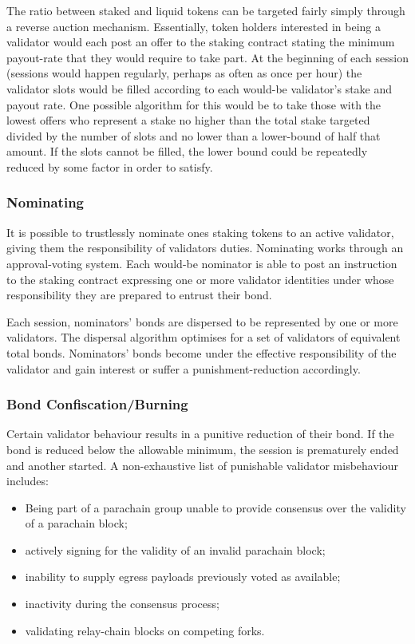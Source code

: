 \documentclass[9pt,oneside]{amsart}
\begin{document}
\begin{multicols}{2}
 The ratio between staked and liquid tokens can be targeted fairly simply through a reverse auction mechanism. Essentially, token holders interested in being a validator would each post an offer to the staking contract stating the minimum payout-rate that they would require to take part. At the beginning of each session (sessions would happen regularly, perhaps as often as once per hour) the validator slots would be filled according to each would-be validator's stake and payout rate. One possible algorithm for this would be to take those with the lowest offers who represent a stake no higher than the total stake targeted divided by the number of slots and no lower than a lower-bound of half that amount. If the slots cannot be filled, the lower bound could be repeatedly reduced by some factor in order to satisfy.

\subsubsection{Nominating}
\label{nominating}

 It is possible to trustlessly nominate ones staking tokens to an active validator, giving them the responsibility of validators duties. Nominating works through an approval-voting system. Each would-be nominator is able to post an instruction to the staking contract expressing one or more validator identities under whose responsibility they are prepared to entrust their bond.

 Each session, nominators' bonds are dispersed to be represented by one or more validators. The dispersal algorithm optimises for a set of validators of equivalent total bonds. Nominators' bonds become under the effective responsibility of the validator and gain interest or suffer a punishment-reduction accordingly.

\subsubsection{Bond Confiscation/Burning}
\label{bond-confiscationburning}

 Certain validator behaviour results in a punitive reduction of their bond. If the bond is reduced below the allowable minimum, the session is prematurely ended and another started. A non-exhaustive list of punishable validator misbehaviour includes:

\begin{itemize}
\item Being part of a parachain group unable to provide consensus over the validity of a parachain block;
\item actively signing for the validity of an invalid parachain block;
\item inability to supply egress payloads previously voted as available;
\item inactivity during the consensus process;
\item validating relay-chain blocks on competing forks.
\end{itemize}


\end{multicols}
\end{document}
